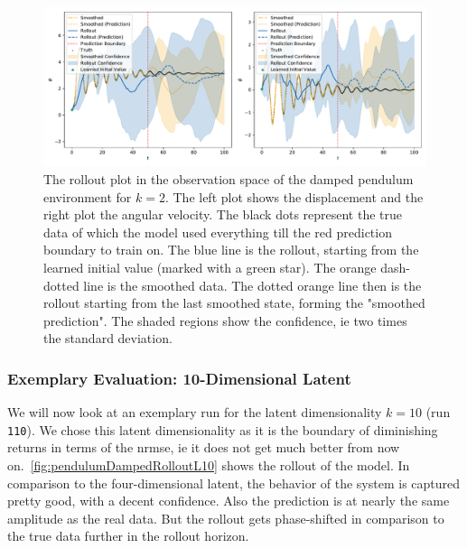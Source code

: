 			\begin{figure}
				\centering
				\includegraphics[width=\linewidth]{figures/results/pendulum-damped/run-latent-dim-02/rollout-observations-N0.pdf}
				\caption{The rollout plot in the observation space of the damped pendulum environment for \(k = 2\). The left plot shows the displacement and the right plot the angular velocity. The black dots represent the true data of which the model used everything till the red prediction boundary to train on. The blue line is the rollout, starting from the learned initial value (marked with a green star). The orange dash-dotted line is the smoothed data. The dotted orange line then is the rollout starting from the last smoothed state, forming the "smoothed prediction". The shaded regions show the confidence, \ac{ie} two times the standard deviation.}
				\label{fig:pendulumDampedRolloutL02}
			\end{figure}

		\subsubsection{Exemplary Evaluation: 10-Dimensional Latent}
			\label{subsubsec:pendulumDampedL10}

			We will now look at an exemplary run for the latent dimensionality \( k = 10 \) (run \texttt{110}). We chose this latent dimensionality as it is the boundary of diminishing returns in terms of the \ac{nrmse}, \ac{ie} it does not get much better from now on.~\autoref{fig:pendulumDampedRolloutL10} shows the rollout of the model. In comparison to the four-dimensional latent, the behavior of the system is captured pretty good, with a decent confidence. Also the prediction is at nearly the same amplitude as the real data. But the rollout gets phase-shifted in comparison to the true data further in the rollout horizon.

